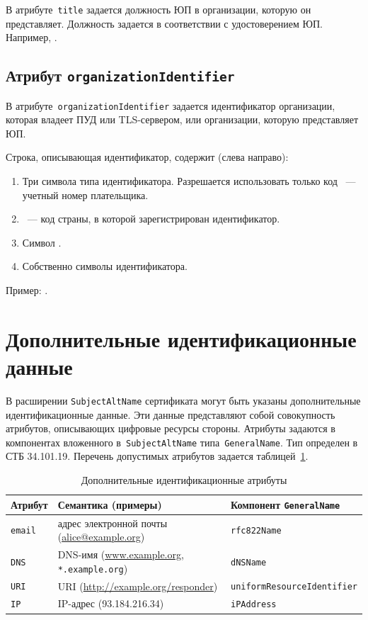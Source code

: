 В атрибуте~\texttt{title} задается должность ЮП в организации, которую он 
представляет. 
%
Должность задается в соответствии с удостоверением ЮП. Например, 
.   

\subsection{Атрибут \texttt{organizationIdentifier}}\label{ENTITIES.Id.ORGID}

В атрибуте~\texttt{organizationIdentifier} задается идентификатор организации,
которая владеет ПУД или TLS-сервером, или организации, которую 
представляет ЮП.

Строка, описывающая идентификатор, содержит (слева направо):
\begin{enumerate}
\item
Три символа типа идентификатора.
Разрешается использовать только код 
~--- учетный номер плательщика.

\item
{}~--- код страны, в которой зарегистрирован идентификатор.

\item
Символ \str{-}.
\item
Собственно символы идентификатора.
\end{enumerate}

Пример: .

\section{Дополнительные идентификационные данные}\label{ENTITIES.SAN}

В расширении \texttt{SubjectAltName} сертификата могут быть указаны 
дополнительные идентификационные данные. Эти данные представляют собой 
совокупность атрибутов, описывающих цифровые ресурсы стороны. 
%
Атрибуты задаются в компонентах вложенного в~\texttt{SubjectAltName} 
типа~\texttt{GeneralName}. Тип определен в СТБ 34.101.19.
%
Перечень допустимых атрибутов задается таблицей~\ref{Table.ENTITIES.AttrsEx}. 

\begin{table}[H]
\caption{Дополнительные идентификационные атрибуты}
\label{Table.ENTITIES.AttrsEx}
\begin{tabular}{|l|p{8.9cm}|l|}
\hline
Атрибут & Семантика (примеры) & Компонент \texttt{GeneralName}\\
\hline
\hline
\texttt{email} & 
адрес электронной почты (\url{alice@example.org}) & 
\verb|rfc822Name|\\
%
\texttt{DNS} & 
DNS-имя (\url{www.example.org}, \texttt{*.example.org}) &
\verb|dNSName|\\
%
\texttt{URI} & 
URI (\url{http://example.org/responder}) &
\verb|uniformResourceIdentifier|\\
%
\texttt{IP} & 
IP-адрес (93.184.216.34) &
\verb|iPAddress|\\
\hline                                      
\end{tabular}
\end{table}

